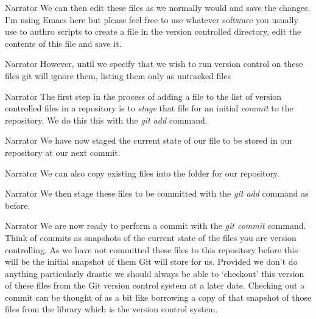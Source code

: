 \documentclass{screenplay} %
\begin{document}
\begin{dialogue}{Narrator}
We can then edit these files as we normally would and save the changes.  I'm using Emacs here but please feel free to use whatever software you usually use to authro scripts to create a file in the version controlled directory, edit the contents of this file and save it.
\end{dialogue}

\begin{dialogue}{Narrator}
However, until we specify that we wish to run version control on these files git will ignore them, listing them only as untracked files
\end{dialogue}

\begin{dialogue}{Narrator}
The first step in the process of adding a file to the list of version controlled files in a repository is to \textit{stage} that file for an initial \textit{commit} to the repository.  We do this this with the \textit{git add} command.
\end{dialogue}

\begin{dialogue}{Narrator}
We have now staged the current state of our file to be stored in our repository at our next commit.
\end{dialogue}

\begin{dialogue}{Narrator}
We can also copy existing files into the folder for our repository.
\end{dialogue}

\begin{dialogue}{Narrator}
We then stage these files to be committed with the \textit{git add} command as before. 
\end{dialogue}

\begin{dialogue}{Narrator}
We are now ready to perform a commit with the \textit{git commit} command.  Think of commits as snapshots of the current state of the files you are version controlling.  As we have not committed these files to this repository before this will be the initial snapshot of them Git will store for us.  Provided we don't do anything particularly drastic we should always be able to `checkout' this version of these files from the Git version control system at a later date. Checking out a commit can be thought of as a bit like borrowing a copy of that snapshot of those files from the library which is the version control system.
\end{dialogue}
\end{document}
